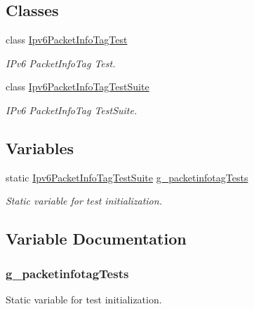 \subsection*{Classes}
\begin{DoxyCompactItemize}
\item 
class \hyperlink{classIpv6PacketInfoTagTest}{Ipv6\+Packet\+Info\+Tag\+Test}
\begin{DoxyCompactList}\small\item\em I\+Pv6 Packet\+Info\+Tag Test. \end{DoxyCompactList}\item 
class \hyperlink{classIpv6PacketInfoTagTestSuite}{Ipv6\+Packet\+Info\+Tag\+Test\+Suite}
\begin{DoxyCompactList}\small\item\em I\+Pv6 Packet\+Info\+Tag Test\+Suite. \end{DoxyCompactList}\end{DoxyCompactItemize}
\subsection*{Variables}
\begin{DoxyCompactItemize}
\item 
static \hyperlink{classIpv6PacketInfoTagTestSuite}{Ipv6\+Packet\+Info\+Tag\+Test\+Suite} \hyperlink{ipv6-packet-info-tag-test-suite_8cc_a6e705c9456d32d7654cf8b52aaa84e4b}{g\+\_\+packetinfotag\+Tests}
\begin{DoxyCompactList}\small\item\em Static variable for test initialization. \end{DoxyCompactList}\end{DoxyCompactItemize}


\subsection{Variable Documentation}
\subsubsection[{\texorpdfstring{g\+\_\+packetinfotag\+Tests}{g_packetinfotagTests}}]{ g\+\_\+packetinfotag\+Tests\hspace{0.3cm}{\ttfamily [static]}}\hypertarget{ipv6-packet-info-tag-test-suite_8cc_a6e705c9456d32d7654cf8b52aaa84e4b}{}\label{ipv6-packet-info-tag-test-suite_8cc_a6e705c9456d32d7654cf8b52aaa84e4b}


Static variable for test initialization. 

